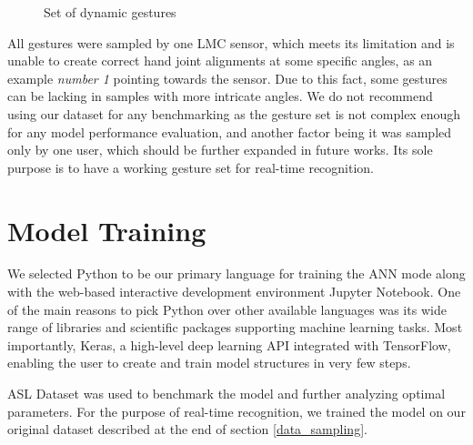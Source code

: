 \begin{enumerate}
    \begin{figure}[h]
        \centering
        \qquad
        \qquad
        \qquad
        \caption{Set of dynamic gestures}
        \label{dynamic_gestures}
    \end{figure}



    
    All gestures were sampled by one LMC sensor, which meets its limitation and is unable to create correct hand joint alignments at some specific angles, as an example \textit{number 1} pointing towards the sensor. Due to this fact, some gestures can be lacking in samples with more intricate angles. We do not recommend using our dataset for any benchmarking as the gesture set is not complex enough for any model performance evaluation, and another factor being it was sampled only by one user, which should be further expanded in future works. Its sole purpose is to have a working gesture set for real-time recognition. 

\end{enumerate}


\section{Model Training}
\label{sec:model_training}

We selected Python to be our primary language for training the ANN mode along with the web-based interactive development environment Jupyter Notebook. One of the main reasons to pick Python over other available languages was its wide range of libraries and scientific packages supporting machine learning tasks. Most importantly, Keras, a high-level deep learning API integrated with TensorFlow, enabling the user to create and train model structures in very few steps.

ASL Dataset was used to benchmark the model and further analyzing optimal parameters. For the purpose of real-time recognition, we trained the model on our original dataset described at the end of section \ref{data_sampling}.

